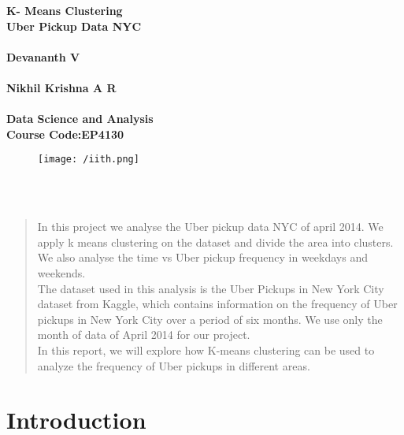 \documentclass[fleqn]{report}
\begin{document}
	\begin{titlepage}
		\begin{center}
			\textbf{\Huge K- Means Clustering\\ Uber Pickup Data NYC}{\Huge}\\
			\\
			\vspace{1.5cm}
			\textbf{\Large Devananth V}\\
			\\
			\textbf{\Large Nikhil Krishna A R}\\
			\\
			\vspace{1.5cm}
			\textbf{\LARGE Data Science and Analysis\\ Course Code:EP4130}\\		
			\vspace{1cm}	
			\begin{figure}[!h]
				\centering
				\texttt{[image: /iith.png]}	
			\end{figure}	
			\vspace{1cm}
			\\
			\\
		\end{center}
	\end{titlepage}
	\tableofcontents
	\begin{abstract}
		In this project we analyse the Uber pickup data NYC of april 2014. We apply k means clustering on the dataset and divide the area into clusters. We also analyse the time vs Uber pickup frequency in weekdays and weekends.\\
		The dataset used in this analysis is the Uber Pickups in New York City dataset from Kaggle, which contains information on the frequency of Uber pickups in New York City over a period of six months. We use only the month of data of April 2014 for our project.\\
		In this report, we will explore how K-means clustering can be used to analyze the frequency of Uber pickups in different areas.
	\end{abstract}
	\chapter{Introduction}
\end{document}
